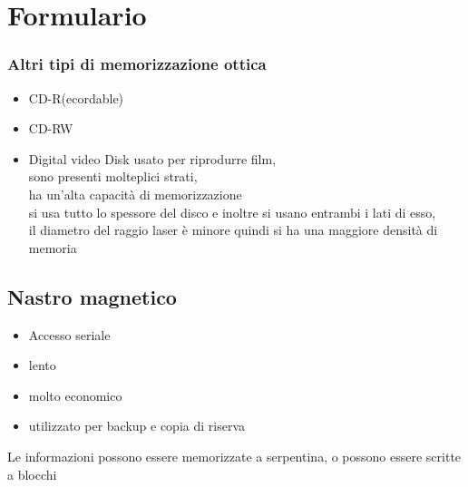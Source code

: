 \documentclass[arch.tex]{subfiles}
\begin{document}
\section{Formulario}



\subsubsection{Altri tipi di memorizzazione ottica}%
\label{subsub:altri_tipi_di_memorizzazione_ottica}

\begin{itemize}
	\item CD-R(ecordable)
	\item CD-RW
	\item Digital video Disk
		usato per riprodurre film, \\
		sono presenti molteplici strati,\\
		ha un'alta capacità di memorizzazione\\
		si usa tutto lo spessore del disco e inoltre si usano entrambi i
		lati di esso,\\
		il diametro del raggio laser è minore quindi si ha una maggiore 
		densità di memoria 

\end{itemize}

\subsection{Nastro magnetico}%
\label{sub:nastro_magnetico}

\begin{itemize}
	\item Accesso seriale
	\item lento
	\item molto economico 
	\item utilizzato per backup e copia di riserva
\end{itemize}
Le informazioni possono essere memorizzate a serpentina, o possono essere scritte 
a blocchi\\
\end{document}

